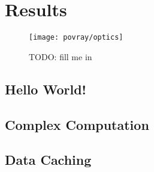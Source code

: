 
\chapter{Results}
\label{cha:results}

\begin{figure}[h]
  \begin{center}
    \texttt{[image: povray/optics]}
  \end{center}
  \caption[An advanced POV-Ray picture]{TODO: fill me in}
  \label{fig:pov-optics}
\end{figure}

\section{Hello World!}
\label{sec:hello-world}

\section{Complex Computation}
\label{sec:complex-example}

\section{Data Caching}
\label{sec:data-caching}



